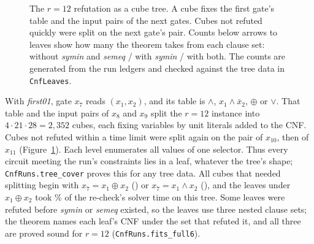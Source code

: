 \documentclass[11pt]{article}
\newcommand{\lean}[1]{\texttt{#1}}
\begin{document}
\begin{figure}[h]
\centering
{}
\caption{The $r=12$ refutation as a cube tree. A cube fixes the first gate's table and the input pairs of the next gates.
Cubes not refuted quickly were split on the next gate's pair. Counts below arrows to
leaves show how many the theorem takes from each clause set: without \emph{symin} and \emph{semeq} / with
\emph{symin} / with both.
The counts are generated from the run ledgers and checked against the tree data in
\lean{CnfLeaves}.}\label{fig:tree}
\end{figure}

With \emph{first01}, gate $x_7$ reads $(x_1,x_2)$, and its table is $\wedge$, $x_1\wedge\bar x_2$, $\oplus$ or
$\vee$. That table and the input pairs of $x_8$ and $x_9$ split the $r=12$ instance into $4\cdot21\cdot28=2{,}352$
cubes, each fixing variables by unit literals added to the CNF. Cubes not refuted within a time limit were split again on the
pair of $x_{10}$, then of $x_{11}$ (Figure~\ref{fig:tree}). Each level enumerates all values of one selector. Thus
every circuit meeting the run's constraints lies in a leaf, whatever the tree's shape; \lean{CnfRuns.tree\_cover}
proves this for any tree data. All \NTreeSThree{} cubes that
needed splitting begin with $x_7=x_1\oplus x_2$ (\NSplitXor) or $x_7=x_1\wedge x_2$ (\NSplitAnd), and the
leaves under $x_1\oplus x_2$ took \NXorShare\% of the re-check's solver time on this tree. Some leaves were refuted before
\emph{symin} or \emph{semeq} existed, so the leaves use three nested clause sets; the theorem names each leaf's
CNF under the set that refuted it, and all three are proved sound for $r=12$ (\lean{CnfRuns.fits\_full6}).
\end{document}
